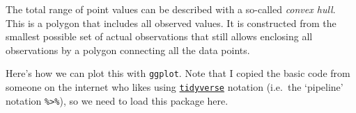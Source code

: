 \documentclass[
]{book}
\newenvironment{Shaded}{\begin{snugshade}}{\end{snugshade}}
\newcommand{\DataTypeTok}[1]{\textcolor[rgb]{0.13,0.29,0.53}{#1}}
\newcommand{\DecValTok}[1]{\textcolor[rgb]{0.00,0.00,0.81}{#1}}
\newcommand{\KeywordTok}[1]{\textcolor[rgb]{0.13,0.29,0.53}{\textbf{#1}}}
\newcommand{\NormalTok}[1]{#1}
\newcommand{\OperatorTok}[1]{\textcolor[rgb]{0.81,0.36,0.00}{\textbf{#1}}}
\begin{document}
\begin{Shaded}
\end{Shaded}

The total range of point values can be described with a so-called \emph{convex hull}. This is a polygon that includes all observed values. It is constructed from the smallest possible set of actual observations that still allows enclosing all observations by a polygon connecting all the data points.

Here's how we can plot this with \texttt{ggplot}. Note that I copied the basic code from someone on the internet who likes using \href{https://cran.r-project.org/web/packages/tidyverse/index.html}{\texttt{tidyverse}} notation (i.e.~the `pipeline' notation \texttt{\%\textgreater{}\%}), so we need to load this package here.
\end{document}
